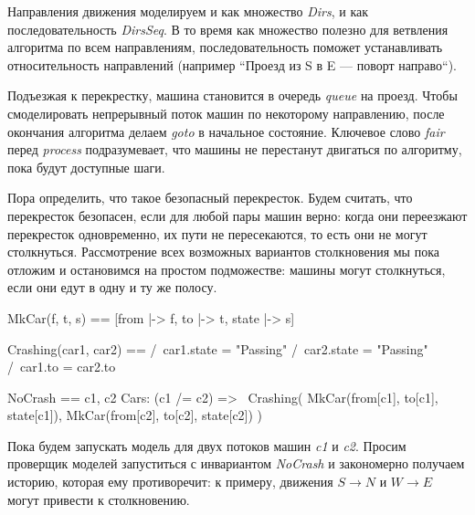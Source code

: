 \documentclass[14pt, openany]{book}
\begin{document}
Направления движения моделируем и как множество \emph{Dirs}, и как последовательность \emph{DirsSeq}. В то время как множество полезно для ветвления алгоритма по всем направлениям, последовательность поможет устанавливать относительность направлений (например ``Проезд из S в E --- поворт направо``).

Подъезжая к перекрестку, машина становится в очередь \emph{queue} на проезд. Чтобы смоделировать непрерывный поток машин по некоторому направлению, после окончания алгоритма делаем \emph{goto} в начальное состояние. Ключевое слово \emph{fair} перед \emph{process} подразумевает, что машины не перестанут двигаться по алгоритму, пока будут доступные шаги.

Пора определить, что такое безопасный перекресток. Будем считать, что перекресток безопасен, если для любой пары машин верно: когда они переезжают перекресток одновременно, их пути не пересекаются, то есть они не могут столкнуться. Рассмотрение всех возможных вариантов столкновения мы пока отложим и остановимся на простом подможестве: машины могут столкнуться, если они едут в одну и ту же полосу.

\begin{tla}
  MkCar(f, t, s) == [from |-> f, to |-> t, state |-> s]

  Crashing(car1, car2) == 
    /\ car1.state = "Passing" 
    /\ car2.state = "Passing" 
    /\ car1.to = car2.to  

  NoCrash == 
    \A c1, c2 \in Cars:
    (c1 /= c2) => ~Crashing(
      MkCar(from[c1], to[c1], state[c1]), 
      MkCar(from[c2], to[c2], state[c2])
    )
\end{tla}
\begin{tlatex}
\@pvspace{8.0pt}%
%
%
%
%
\@pvspace{8.0pt}%
%
%
%
%
%
%
\end{tlatex}

Пока будем запускать модель для двух потоков машин \emph{c1} и \emph{c2}.
Просим проверщик моделей запуститься с инвариантом \emph{NoCrash} и закономерно получаем историю, которая ему противоречит: к примеру, движения \(S \rightarrow N\) и \(W \rightarrow E\) могут привести к столкновению.
\end{document}
